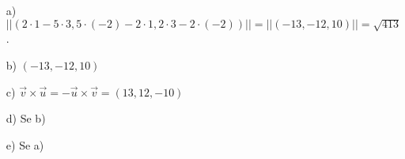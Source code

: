\begin{itemize}
\item[a) ] $||(2 \cdot 1 - 5 \cdot 3, 5 \cdot (-2) - 2 \cdot 1, 2 \cdot 3 - 2 \cdot (-2))|| 
			= ||(-13, -12, 10)|| = \sqrt{413}$.
\item[b) ] $(-13, -12, 10)$
\item[c) ] $\vec{v} \times \vec{u} = -\vec{u} \times \vec{v} = (13, 12, -10)$
\item[d) ] Se b)
\item[e) ] Se a)
\end{itemize}